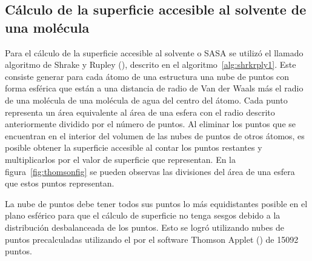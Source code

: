 \subsection{Cálculo de la superficie accesible al solvente de una molécula}
\par
Para el cálculo de la superficie accesible al solvente o SASA se utilizó el llamado algoritmo de Shrake y Rupley (\cite{Shrake1973}), descrito en el algoritmo~\ref{alg:shrkrply1}. Este consiste generar para cada átomo de una estructura una nube de puntos con forma esférica que están a una distancia de radio de Van der Waals más el radio de una molécula de una molécula de agua del centro del átomo. 
Cada punto representa un área equivalente al área de una esfera con el radio descrito anteriormente dividido por el número de puntos.
Al eliminar los puntos que se encuentran en el interior del volumen de las nubes de puntos de otros átomos, es posible obtener la superficie accesible al contar los puntos restantes y multiplicarlos por el valor de superficie que representan.
En la figura~\ref{fig:thomsonfig} se pueden observas las divisiones del área de una esfera que estos puntos representan.
\par
La nube de puntos debe tener todos sus puntos lo más equidistantes posible en el plano esférico para que el cálculo de superficie no tenga sesgos debido a la distribución desbalanceada de los puntos.
Esto se logró utilizando nubes de puntos precalculadas utilizando el por el software Thomson Applet (\cite{Saff1997,thomson}) de 15092 puntos. 

